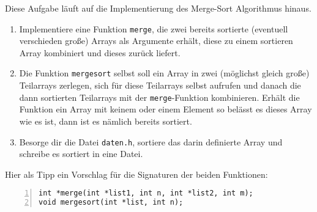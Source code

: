 \begin{aufg}
Diese Aufgabe läuft auf die Implementierung des Merge-Sort Algorithmus hinaus.
\begin{enumerate}
\item Implementiere eine Funktion \verb|merge|, die zwei bereits sortierte (eventuell verschieden große) Arrays als Argumente erhält, diese zu einem sortieren Array kombiniert und dieses zurück liefert. 
\item Die Funktion \verb|mergesort| selbst soll ein Array in zwei (möglichst gleich große) Teilarrays zerlegen, sich für diese Teilarrays selbst aufrufen und danach die dann sortierten Teilarrays mit der \verb|merge|-Funktion kombinieren. Erhält die Funktion ein Array mit keinem oder einem Element so belässt es dieses Array wie es ist, dann ist es nämlich bereits sortiert.
\item Besorge dir die Datei \verb|daten.h|, sortiere das darin definierte Array und schreibe es sortiert in eine Datei.
\end{enumerate}

Hier als Tipp ein Vorschlag für die Signaturen der beiden Funktionen:
\begin{codelisting}
\begin{lstlisting}[numbers=left,numberstyle=\tiny,frame=tlrb]
int *merge(int *list1, int n, int *list2, int m);
void mergesort(int *list, int n);
\end{lstlisting}
\end{codelisting}

\end{aufg}